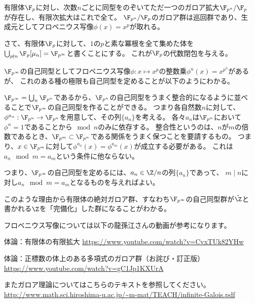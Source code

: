 \documentclass[uplatex]{jsarticle}
\begin{document}
\begin{prop}
  有限体$\F_p$に対し、次数$n$ごとに同型をのぞいてただ一つのガロア拡大$\F_{p^n}/\F_p$が存在し、有限次拡大はこれで全て。
  $\F_{p^n}/\F_p$のガロア群は巡回群であり、生成元としてフロベニウス写像$\phi(x)=x^p$が取れる。
\end{prop}

さて、有限体$\F_p$に対して、$1$の$p$と素な冪根を全て集めた体を$\bigcup_{p\nmid n}\F_p[\mu_n]=\F_{p^\infty}$と書くことにする。
これが$\F_p$の代数閉包を与える。

$\F_{p^\infty}$の自己同型としてフロベニウス写像$\phi:x\mapsto x^p$の整数乗$\phi^n(x)=x^{p^n}$があるが、
これのある種の極限も自己同型を定めることが以下のようにわかる。

$\F_{p^\infty}=\bigcup_n\F_{p^n}$であるから、$\F_{p^n}$の自己同型をうまく整合的になるように並べることで$\F_{p^\infty}$の自己同型を作ることができる。
つまり各自然数$n$に対して、$\phi^{a_n}:\F_{p^n}\to\F_{p^n}$を用意して、その列$\{a_n\}$を考える。
各々$a_n$は$\F_{p^n}$において$\phi^n=1$であることから$\mod n$のみに依存する。
整合性というのは、$n$が$m$の倍数であるとき、$\F_{p^m}\subset\F_{p^n}$である関係をうまく保つことを要請するもの。
つまり、$x\in\F_{p^m}$に対して$\phi^{a_n}(x)=\phi^{a_m}(x)$が成立する必要がある。
これは$a_n\mod m=a_m$という条件に他ならない。

つまり、$\F_{p^\infty}$の自己同型を定めるには、$a_n\in\Z/n$の列$\{a_n\}$であって、
$m\mid n$に対し$a_n\mod m=a_m$となるものを与えればよい。

このような理由から有限体の絶対ガロア群、すなわち$\F_{p^\infty}$の自己同型群が$\hat{\Z}$と書かれる$\Z$を「完備化」した群になることがわかる。

フロベニウス写像については以下の龍孫江さんの動画が参考になります。

体論：有限体の有限拡大
\url{https://www.youtube.com/watch?v=CvxTUk82YHw}

体論：正標数の体上のある多項式のガロア群（お詫び・訂正版）
\url{https://www.youtube.com/watch?v=gC1Jp1KXUrA}

またガロア理論についてはこちらのテキストを参照してください。
\url{http://www.math.sci.hiroshima-u.ac.jp/~m-mat/TEACH/infinite-Galois.pdf}
\end{document}
